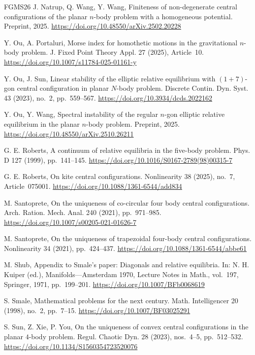 \documentclass[Threeside,11pt]{article}
\theoremstyle{definition}
\theoremstyle{remark}
\numberwithin{equation}{section}
\theoremstyle{remark}
\begin{document}
\begin{thebibliography}{FGMS26}
J. Natrup, Q. Wang, Y. Wang,
Finiteness of non-degenerate central configurations of the planar $n$-body problem with a homogeneous potential.
Preprint, 2025.
\url{https://doi.org/10.48550/arXiv.2502.20228}

Y. Ou, A. Portaluri,
Morse index for homothetic motions in the gravitational
$n$-body problem.
J. Fixed Point Theory Appl. 27 (2025), Article~10.
\url{https://doi.org/10.1007/s11784-025-01161-y}

Y. Ou, J. Sun,
Linear stability of the elliptic relative equilibrium with
$(1+7)$-gon central configuration in planar $N$-body problem.
Discrete Contin. Dyn. Syst. 43 (2023), no.~2, pp.~559--567.
\url{https://doi.org/10.3934/dcds.2022162}

Y. Ou, Y. Wang,
Spectral instability of the regular $n$-gon elliptic
relative equilibrium in the planar $n$-body problem.
Preprint, 2025.
\url{https://doi.org/10.48550/arXiv.2510.26211}

G. E. Roberts,
A continuum of relative equilibria in the five-body problem.
Phys. D 127 (1999), pp.~141--145.
\url{https://doi.org/10.1016/S0167-2789(98)00315-7}

G. E. Roberts,
On kite central configurations.
Nonlinearity 38 (2025), no.~7, Article~075001.
\url{https://doi.org/10.1088/1361-6544/add834}

M. Santoprete,
On the uniqueness of co-circular four body central configurations.
Arch. Ration. Mech. Anal. 240 (2021), pp.~971--985.
\url{https://doi.org/10.1007/s00205-021-01626-7}

M. Santoprete,
On the uniqueness of trapezoidal four-body central configurations.
Nonlinearity 34 (2021), pp.~424--437.
\url{https://doi.org/10.1088/1361-6544/abbe61}

M. Shub,
Appendix to Smale's paper: Diagonals and relative equilibria.
In: N. H. Kuiper (ed.), Manifolds---Amsterdam 1970,
Lecture Notes in Math., vol.~197, Springer, 1971, pp.~199--201.
\url{https://doi.org/10.1007/BFb0068619}

S. Smale,
Mathematical problems for the next century.
Math. Intelligencer 20 (1998), no.~2, pp.~7--15.
\url{https://doi.org/10.1007/BF03025291}

S. Sun, Z. Xie, P. You,
On the uniqueness of convex central configurations in the planar $4$-body problem.
Regul. Chaotic Dyn. 28 (2023), nos.~4--5, pp.~512--532.
\url{https://doi.org/10.1134/S1560354723520076}


\end{thebibliography}
\end{document}
